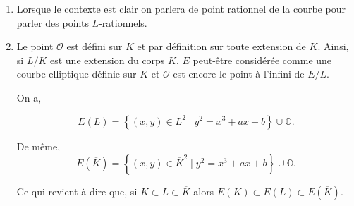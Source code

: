 \begin{remarque}
    \begin{enumerate}
        \item  Lorsque le contexte est clair on parlera de point rationnel de la courbe pour
            parler des points $L$-rationnels.
        \item Le point $\mathcal{O}$ est défini sur $K$ et par définition sur toute
            extension de $K$. Ainsi, si $L / K$ est une extension du corps $K$, $E$
            peut-être considérée comme une courbe elliptique définie sur $K$ et $\mathcal{O}$
            est encore le point à l'infini de $E / L$.

            On a,

            \[
            E(L) = \left\{ (x,y) \in L^2 \mid y^2 = x^3 + ax + b \right\} \cup {\mathbb{O}}
            .\] 

            De même,
            \[
            E(\overline{K}) = \left\{ (x,y) \in \overline{K}^2 \mid y^2 = x^3 +
            ax + b \right\} \cup {\mathbb{O}}
            .\] 

            Ce qui revient à dire que, si $K \subset L \subset \overline{K}$ alors $E(K)
            \subset E(L) \subset E(\overline{K})$.
    \end{enumerate}
\end{remarque}

